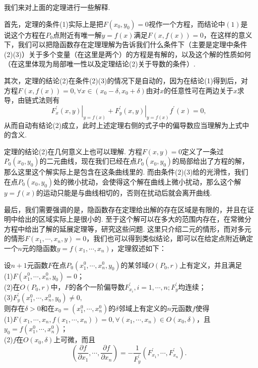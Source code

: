 \documentclass{ctexart}
\begin{document}
我们来对上面的定理进行一些解释. 

首先，定理的条件(1)实际上是把$F(x_{0},y_{0})=0$视作一个方程，而结论中$(1)$是说这个方程在$P_{0}$点附近有唯一解$y=f(x)$满足$F(x,f(x))=0$，在这样的意义下，我们可以把隐函数存在定理理解为告诉我们什么条件下（主要是定理中条件(2)(3)）关于多个变量（在这里是两个）的方程是有解的，以及这个解的性质如何（在这里体现为局部唯一性以及定理结论(2)关于导数的条件）.

其次，定理的结论(2)在条件(2)(3)的情况下是自动的，因为在结论(1)得到后，对方程$F(x,f(x))=0,\forall x\in(x_{0}-\delta,x_{0}+\delta)$由对$x$的任意性可在两边关于$x$求导，由链式法则有
$$\left.F_{x}^{\prime}(x,y)\right|_{y=f(x)}+\left.F_{y}^{\prime}(x,y)\right|_{y=f(x)}f^{\prime}(x)=0,$$
从而自动有结论(2)成立，此时上述定理右侧的式子中的偏导数应当理解为上式中的含义.

定理的结论(2)在几何意义上也可以理解. 方程$F(x,y)=0$定义了一条过$P_{0}(x_{0},y_{0})$的二元曲线，现在我们已经在点$P_{0}(x_{0},y_{0})$的局部给出了方程的解，那么这里这个解实际上是包含在这条曲线里的. 而由条件(2)(3)给的光滑性，我们在点$P_{0}(x_{0},y_{0})$处的微小扰动，会使得这个解在曲线上微小扰动，那么这个解$y=f(x)$的运动只能是与曲线相切的，否则在扰动后就会离开曲线.

最后，我们需要强调的是，隐函数存在定理给出解的存在区域是有限的，并且在证明中给出的区域实际上是很小的. 至于这个解可以在多大的范围内存在，在常微分方程中给出了解的延展定理等，研究这些问题. 这里只介绍二元的情形，而对多元的情形$F(x_{1},\cdots,x_{n},y)=0$，我们也可以得到类似结论，即可以在给定点附近确定一个$n$元的隐函数$y=f(x_{1},\cdots,x_{n})$，定理叙述如下：
\begin{theorem}
设$n+1$元函数$F$在点$P_{0}(x_{1}^{0},\cdots,x_{n}^{0},y_{0})$的某邻域$O(P_{0},r)$上有定义，并且满足\\
(1)$F(x_{1}^{0},\cdots,x_{n}^{0},y_{0})=0$；\\
(2)在$O(P_{0},r)$中，$F$的各个一阶偏导数$F_{x_{i}}^{\prime},i=1,\cdots,n; F_{y}^{\prime}$均连续；\\
(3)$F_{y}^{\prime}(x_{1}^{0},\cdots,x_{n}^{0},y_{0})\neq 0,$\\
则存在$\delta>0$和在$x_{0}=(x_{1}^{0},\cdots,x_{n}^{0})$的$\delta$邻域上有定义的$n$元函数$f$使得\\
(1)$F(x_{1},\cdots,x_{n},f(x_{1},\cdots,x_{n}))=0,\forall(x_{1},\cdots,x_{n})\in O(x_{0},\delta)$，且$y_{0}=f(x_{1}^{0},\cdots,x_{n}^{0})$；\\
(2)$f$在$O(x_{0},\delta)$上可微，而且
$$(\frac{\partial f}{\partial x_{1}},\cdots,\frac{\partial f}{\partial x_{n}})=-\frac{1}{F_{y}^{\prime}}(F_{x_{1}}^{\prime},\cdots,F_{x_{n}}^{\prime}).$$
\end{theorem}
\end{document}
